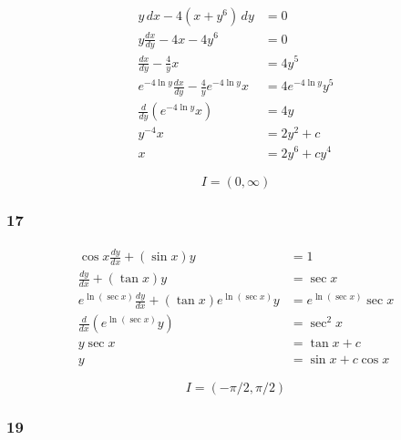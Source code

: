 \documentclass{article}
\begin{document}
\begin{align*}
  y \,d x - 4 (x + y^6) \,d y                               & = 0                  \\
  y \frac{d x}{d y} - 4 x - 4 y^6                           & = 0                  \\
  \frac{d x}{d y} - \frac{4}{y} x                           & = 4 y^5              \\
  e^{-4 \ln y} \frac{d x}{d y} - \frac{4}{y} e^{-4 \ln y} x & = 4 e^{-4 \ln y} y^5 \\
  \frac{d}{dy} (e^{-4 \ln y} x)                             & = 4 y                \\
  y^{-4} x                                                  & = 2 y^2 + c          \\
  x                                                         & = 2 y^6 + c y^4
\end{align*}

\[I = (0, \infty)\]

\subsubsection{17}

\begin{align*}
  \cos x \frac{d y}{d x} + (\sin x) y                            & = 1                       \\
  \frac{d y}{d x} + (\tan x) y                                   & = \sec x                  \\
  e^{\ln (\sec x)} \frac{d y}{d x} + (\tan x) e^{\ln (\sec x)} y & = e^{\ln (\sec x)} \sec x \\
  \frac{d}{d x} (e^{\ln (\sec x)} y)                             & = \sec^2 x                \\
  y \sec x                                                       & = \tan x + c              \\
  y                                                              & = \sin x + c \cos x
\end{align*}

\[I = (-\pi / 2, \pi / 2)\]

\subsubsection{19}
\end{document}
